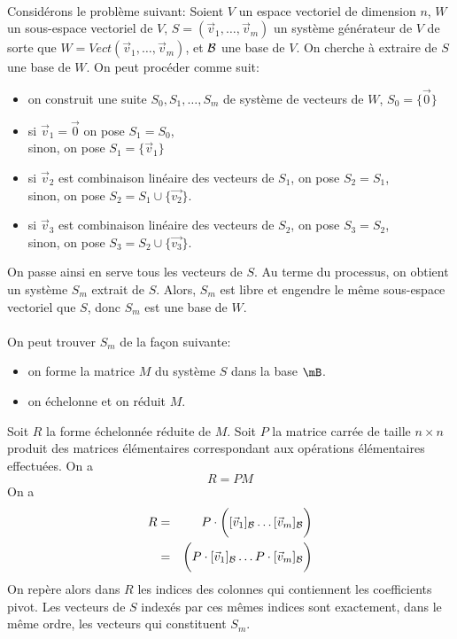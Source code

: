 {\paragraph{} Considérons le problème suivant: Soient $V$ un espace vectoriel de dimension $n$, $W$ un sous-espace vectoriel de $V$, $S = (\vec{v}_1, \ldots, \vec{v}_m)$ un système générateur de $V$ de sorte que $W = Vect(\vec{v}_1, \ldots, \vec{v}_m)$, et $\mathcal{B}$ une base de $V$. On cherche à extraire de $S$ une base de $W$. On peut procéder comme suit:
\begin{itemize}
  \item on construit une suite $S_0, S_1, \ldots, S_m$ de système de vecteurs de $W$, $S_0 = \{\vec{0}\}$
  \item si $\vec{v}_1 = \vec{0}$ on pose $S_1 = S_0$, \\
    sinon, on pose $S_1 = \{\vec{v}_1\}$
  \item si $\vec{v}_2$ est combinaison linéaire des vecteurs de $S_1$, on pose $S_2 = S_1$, \\
    sinon, on pose $S_2 = S_1 \cup \{\vec{v_2}\}$.
  \item si $\vec{v}_3$ est combinaison linéaire des vecteurs de $S_2$, on pose $S_3 = S_2$, \\
    sinon, on pose $S_3 = S_2 \cup \{\vec{v_3}\}$.
\end{itemize}
On passe ainsi en serve tous les vecteurs de $S$. Au terme du processus, on obtient un système $S_m$ extrait de $S$. Alors, $S_m$ est libre et engendre le même sous-espace vectoriel que $S$,  donc $S_m$ est une base de $W$. 
\\\\
On peut trouver $S_m$ de la façon suivante:
\begin{itemize}
  \item on forme la matrice $M$ du système $S$ dans la base $\mB$.
  \item on échelonne et on réduit $M$.
\end{itemize}
Soit $R$ la forme échelonnée réduite de $M$. Soit $P$ la matrice carrée de taille $n\times n$ produit des matrices élémentaires correspondant aux opérations élémentaires effectuées. On a 
$$R = P M$$
On a 
\begin{eqnarray*}
  R &=& P \cdot \bigg([\vec{v}_1]_{\mathcal{B}} \ldots [\vec{v}_m]_{\mathcal{B}} \bigg) \\
   &=& \bigg(P \cdot [\vec{v}_1]_{\mathcal{B}} \ldots P \cdot [\vec{v}_m]_{\mathcal{B}} \bigg) \\
\end{eqnarray*}
On repère alors dans $R$ les indices des colonnes qui contiennent les coefficients pivot. Les vecteurs de $S$ indexés par ces mêmes indices sont exactement, dans le même ordre, les vecteurs qui constituent $S_m$.

}
